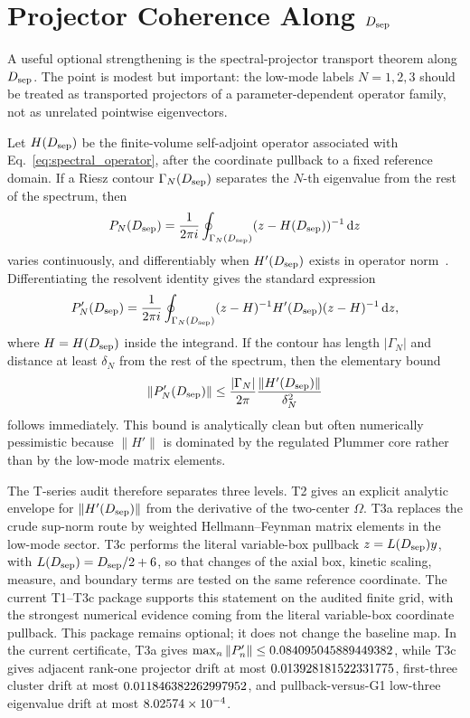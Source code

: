\documentclass[aps,prd,onecolumn,notitlepage,nofootinbib,superscriptaddress,11pt,floatfix]{revtex4-2}
\newcommand{\dd}{\mathrm{d}}
\newcommand{\Dsep}{D_{\rm sep}}
\begin{document}
\section{Projector Coherence Along \texorpdfstring{\(\Dsep\)}{Dsep}}
\label{sec:projector_transport}

A useful optional strengthening is the spectral-projector transport theorem along \(\Dsep\).
The point is modest but important: the low-mode labels \(N=1,2,3\) should be treated as transported projectors of a parameter-dependent operator family, not as unrelated pointwise eigenvectors.

Let \(H(\Dsep)\) be the finite-volume self-adjoint operator associated with Eq.~\eqref{eq:spectral_operator}, after the coordinate pullback to a fixed reference domain.
If a Riesz contour \(\Gamma_N(\Dsep)\) separates the \(N\)-th eigenvalue from the rest of the spectrum, then
\begin{equation}
    P_N(\Dsep)=\frac{1}{2\pi i}\oint_{\Gamma_N(\Dsep)}(z-H(\Dsep))^{-1}\,\dd z
    \label{eq:riesz_projector}
\end{equation}
varies continuously, and differentiably when \(H'(\Dsep)\) exists in operator norm~\cite{Kato1995}.
Differentiating the resolvent identity gives the standard expression
\begin{equation}
    P_N'(\Dsep)
    =
    \frac{1}{2\pi i}
    \oint_{\Gamma_N(\Dsep)}
    (z-H)^{-1}H'(\Dsep)(z-H)^{-1}
    \,\dd z,
    \label{eq:projector_derivative}
\end{equation}
where \(H=H(\Dsep)\) inside the integrand.
If the contour has length \(|\Gamma_N|\) and distance at least \(\delta_N\) from the rest of the spectrum, then the elementary bound
\begin{equation}
    \|P_N'(\Dsep)\|
    \le
    \frac{|\Gamma_N|}{2\pi}
    \frac{\|H'(\Dsep)\|}{\delta_N^2}
    \label{eq:projector_derivative_bound}
\end{equation}
follows immediately.
This bound is analytically clean but often numerically pessimistic because \(\|H'\|\) is dominated by the regulated Plummer core rather than by the low-mode matrix elements.

The T-series audit therefore separates three levels.
T2 gives an explicit analytic envelope for \(\|H'(\Dsep)\|\) from the derivative of the two-center \(\Omega\).
T3a replaces the crude sup-norm route by weighted Hellmann--Feynman matrix elements in the low-mode sector.
T3c performs the literal variable-box pullback \(z=L(\Dsep)y\), with \(L(\Dsep)=\Dsep/2+6\), so that changes of the axial box, kinetic scaling, measure, and boundary terms are tested on the same reference coordinate.
The current T1--T3c package supports this statement on the audited finite grid, with the strongest numerical evidence coming from the literal variable-box coordinate pullback.
This package remains optional; it does not change the baseline map.
In the current certificate, T3a gives \(\max_n\|P'_n\|\le 0.084095045889449382\), while T3c gives adjacent rank-one projector drift at most \(0.013928181522331775\), first-three cluster drift at most \(0.011846382262997952\), and pullback-versus-G1 low-three eigenvalue drift at most \(8.02574\times 10^{-4}\).
\end{document}
